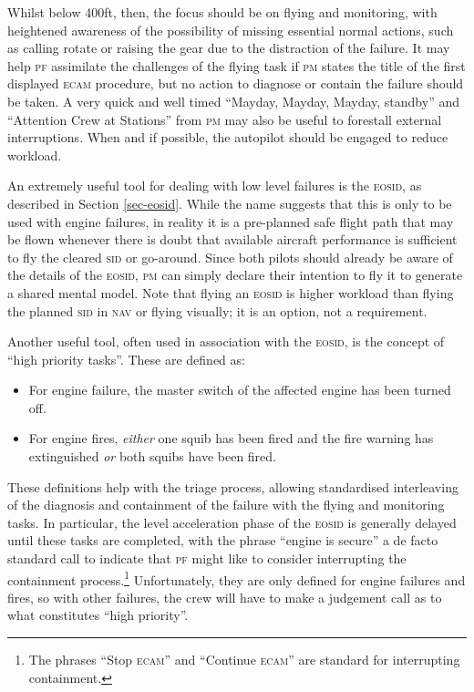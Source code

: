 \documentclass[a5paper,11pt,twoside]{book}
\newcommand{\ac}[1]{{\scshape\MakeLowercase{#1}}}
\begin{document}
Whilst below 400ft, then, the focus should be on flying and monitoring, with
heightened awareness of the possibility of missing essential normal actions,
such as calling rotate or raising the gear due to the distraction of the
failure. It may help \ac{PF} assimilate the challenges of the flying task if
\ac{PM} states the title of the first displayed \ac{ECAM} procedure, but no
action to diagnose or contain the failure should be taken. A very quick and well
timed ``Mayday, Mayday, Mayday, standby'' and ``Attention Crew at Stations''
from \ac{PM} may also be useful to forestall external interruptions. When and if
possible, the autopilot should be engaged to reduce workload.

An extremely useful tool for dealing with low level failures is the \ac{EOSID},
as described in Section \ref{sec-eosid}. While the name suggests that this is
only to be used with engine failures, in reality it is a pre-planned safe flight
path that may be flown whenever there is doubt that available aircraft
performance is sufficient to fly the cleared \ac{SID} or go-around. Since both
pilots should already be aware of the details of the \ac{EOSID}, \ac{PM} can
simply declare their intention to fly it to generate a shared mental model.
Note that flying an \ac{EOSID} is higher workload than flying the planned
\ac{SID} in \ac{NAV} or flying visually; it is an option, not a requirement.

Another useful tool, often used in association with the \ac{EOSID}, is the
concept of ``high priority tasks''. These are defined as:

\begin{itemize}
\item For engine failure, the master switch of the affected engine has been
  turned off.

\item For engine fires, \emph{either} one squib has been fired and the fire
  warning has extinguished \emph{or} both squibs have been fired.
\end{itemize}

These definitions help with the triage process, allowing standardised
interleaving of the diagnosis and containment of the failure with the flying and
monitoring tasks. In particular, the level acceleration phase of the \ac{EOSID}
is generally delayed until these tasks are completed, with the phrase ``engine
is secure'' a de facto standard call to indicate that \ac{PF} might like to
consider interrupting the containment process.\footnote{The phrases ``Stop
\ac{ECAM}'' and ``Continue \ac{ECAM}'' are standard for interrupting
containment.}  Unfortunately, they are only defined for engine failures and
fires, so with other failures, the crew will have to make a judgement call as to
what constitutes ``high priority''.
\end{document}
